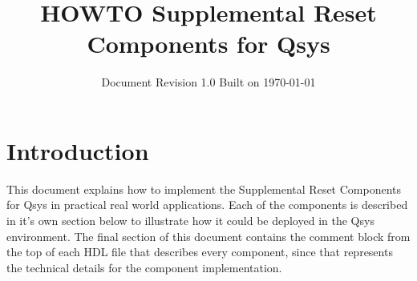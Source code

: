 \documentclass{article}
\title{HOWTO Supplemental Reset Components for Qsys}
\author{}
\date{
Document Revision 1.0
\newline
\newline
Built on \today
\newline
}
\begin{document}
\maketitle

\tableofcontents

\section*{Introduction}
\begin{flushleft}
\noindent
This document explains how to implement the Supplemental Reset Components for Qsys in practical real world applications.  Each of the components is described in it's own section below to illustrate how it could be deployed in the Qsys environment.  The final section of this document contains the comment block from the top of each HDL file that describes every component, since that represents the technical details for the component implementation.

\end{flushleft}

\end{document}
